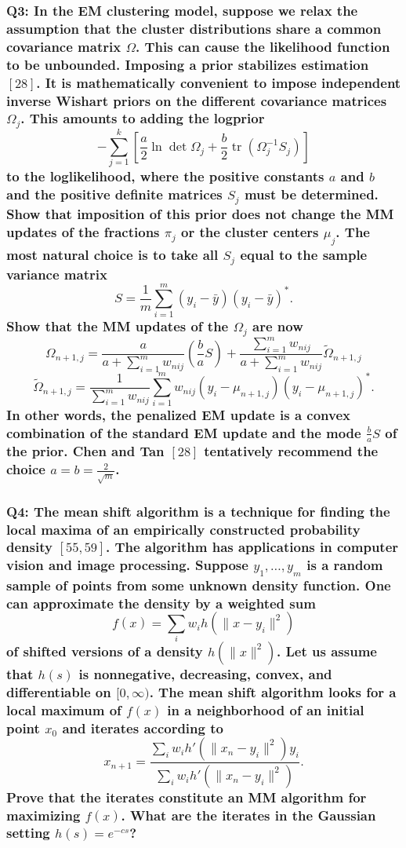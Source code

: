 \documentclass{article}
\begin{document}
\subsubsection*{Q3: In the EM clustering model, suppose we relax the assumption that the cluster distributions share a common covariance matrix \(\Omega\). This can cause the likelihood function to be unbounded. Imposing a prior stabilizes estimation \([28]\). It is mathematically convenient to impose independent inverse Wishart priors on the different covariance matrices \(\Omega_j\). This amounts to adding the logprior
\[
- \sum_{j=1}^{k} \left[ \frac{a}{2} \ln \det \Omega_j + \frac{b}{2} \operatorname{tr}(\Omega_j^{-1} S_j) \right]
\]
to the loglikelihood, where the positive constants \(a\) and \(b\) and the positive definite matrices \(S_j\) must be determined. Show that imposition of this prior does not change the MM updates of the fractions \(\pi_j\) or the cluster centers \(\mu_j\). The most natural choice is to take all \(S_j\) equal to the sample variance matrix
\[
S = \frac{1}{m} \sum_{i=1}^{m} (y_i - \bar{y})(y_i - \bar{y})^*.
\]
Show that the MM updates of the \(\Omega_j\) are now
\[
\Omega_{n+1,j} = \frac{a}{a + \sum_{i=1}^{m} w_{nij}} \left( \frac{b}{a} S \right) + \frac{\sum_{i=1}^{m} w_{nij}}{a + \sum_{i=1}^{m} w_{nij}} \tilde{\Omega}_{n+1,j}
\]
\[
\tilde{\Omega}_{n+1,j} = \frac{1}{\sum_{i=1}^{m} w_{nij}} \sum_{i=1}^{m} w_{nij} (y_i - \mu_{n+1,j})(y_i - \mu_{n+1,j})^*.
\]
In other words, the penalized EM update is a convex combination of the standard EM update and the mode \(\frac{b}{a} S\) of the prior. Chen and Tan \([28]\) tentatively recommend the choice \(a = b = \frac{2}{\sqrt{m}}\).}

\subsubsection*{Q4: The mean shift algorithm is a technique for finding the local maxima of an empirically constructed probability density \([55, 59]\). The algorithm has applications in computer vision and image processing. Suppose \( y_1, \ldots, y_m \) is a random sample of points from some unknown density function. One can approximate the density by a weighted sum
\[
f(x) = \sum_i w_i h(\|x - y_i\|^2)
\]
of shifted versions of a density \( h(\|x\|^2) \). Let us assume that \( h(s) \) is nonnegative, decreasing, convex, and differentiable on \([0, \infty)\). The mean shift algorithm looks for a local maximum of \( f(x) \) in a neighborhood of an initial point \( x_0 \) and iterates according to
\[
x_{n+1} = \frac{\sum_i w_i h'(\|x_n - y_i\|^2) y_i}{\sum_i w_i h'(\|x_n - y_i\|^2)}.
\]
Prove that the iterates constitute an MM algorithm for maximizing \( f(x) \). What are the iterates in the Gaussian setting \( h(s) = e^{-cs} \)?}
\end{document}

